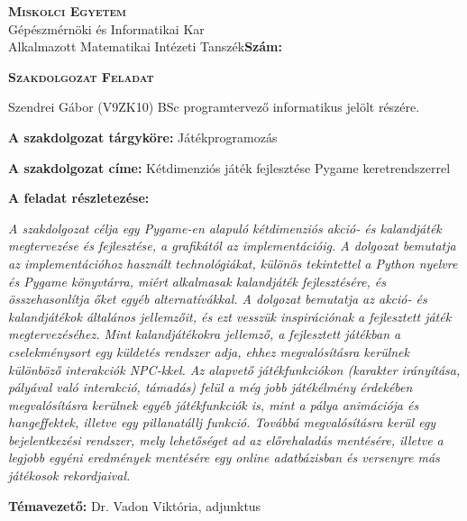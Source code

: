 \noindent
\textsc{\textbf{Miskolci Egyetem}}\\
Gépészmérnöki és Informatikai Kar\\
Alkalmazott Matematikai Intézeti Tanszék\hspace*{4cm}\hfil \textbf{Szám:}

\vspace{0.5cm}
\begin{center}
\large\textsc{\textbf{Szakdolgozat Feladat}}
\end{center}
\vspace{0.5cm}

Szendrei Gábor (V9ZK10) BSc programtervező informatikus jelölt részére.

\bigskip
\noindent\textbf{A szakdolgozat tárgyköre:} Játékprogramozás

\bigskip
\noindent\textbf{A szakdolgozat címe:} Kétdimenziós játék fejlesztése Pygame keretrendszerrel

\bigskip
\noindent\textbf{A feladat részletezése:}

\medskip

\emph{A szakdolgozat célja egy Pygame-en alapuló kétdimenziós akció- és kalandjáték megtervezése és fejlesztése, a grafikától az implementációig. A dolgozat bemutatja az implementációhoz használt technológiákat, különös tekintettel a Python nyelvre és Pygame könyvtárra, miért alkalmasak kalandjáték fejlesztésére, és összehasonlítja őket egyéb alternatívákkal.
A dolgozat bemutatja az akció- és kalandjátékok általános jellemzőit, és ezt vesszük inspirációnak a fejlesztett játék megtervezéséhez. Mint kalandjátékokra jellemző, a fejlesztett játékban a cselekménysort egy küldetés rendszer adja, ehhez megvalósításra kerülnek különböző interakciók NPC-kkel. Az alapvető játékfunkciókon (karakter irányítása, pályával való interakció, támadás) felül a még jobb játékélmény érdekében megvalósításra kerülnek egyéb játékfunkciók is, mint a pálya animációja és hangeffektek, illetve egy pillanatállj funkció. Továbbá megvalósításra kerül egy bejelentkezési rendszer, mely lehetőséget ad az előrehaladás mentésére, illetve a legjobb egyéni eredmények mentésére egy online adatbázisban és versenyre más játékosok rekordjaival.
}



\vfill

\noindent\textbf{Témavezető:} Dr. Vadon Viktória, adjunktus

